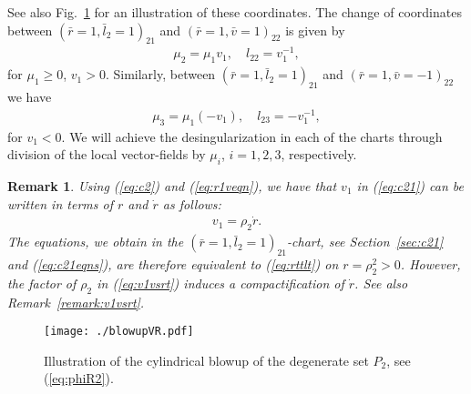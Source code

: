 \documentclass[reqno,12pt]{amsart}
\newcommand{\secref}[1]{Section~\ref{sec:#1}}
\newcommand{\eqlab}[1]{\label{eq:#1}}
\renewcommand{\eqref}[1]{(\ref{eq:#1})}
\newcommand{\figref}[1]{Fig.~\ref{fig:#1}}
\newcommand{\figlab}[1]{\label{fig:#1}}
\newcommand{\remref}[1]{Remark~\ref{remark:#1}}
\newcommand{\remlab}[1]{\label{remark:#1}}
\newtheorem{remark}[theorem]{Remark}
\numberwithin{equation}{section}
\begin{document}
See also \figref{blowupVR} for an illustration of these coordinates. 
The change of coordinates between $(\bar r=1,\bar l_2=1)_{21}$ and $(\bar r=1,\bar v=1)_{22}$ is given by 
\begin{align}
 \mu_2=\mu_1 v_1,\quad l_{22}=v_1^{-1},\eqlab{cc2122}
\end{align}
for $\mu_1\ge 0$, $v_1>0$. Similarly, between $(\bar r=1,\bar l_2=1)_{21}$ and $(\bar r=1,\bar v=-1)_{22}$ we have
\begin{align}
 \mu_3=\mu_1 (-v_1),\quad l_{23}=-v_1^{-1},\eqlab{cc2223}
\end{align}
for $v_1<0$. 
We will achieve the desingularization in each of the charts through division of the local vector-fields by $\mu_i$, $i=1,2,3$, respectively.

\begin{remark}\remlab{v1vsrt0}
 Using \eqref{c2} and \eqref{r1veqn}, we have that $v_1$ in \eqref{c21} can be written in terms of $r$ and $\dot r$ as follows:
 \begin{align}
v_1 = \rho_2 \dot r.\eqlab{v1vsrt}
 \end{align}
The equations, we obtain in the $(\bar r=1,\bar l_2=1)_{21}$-chart, see \secref{c21} and \eqref{c21eqns}, are therefore equivalent to \eqref{rttlt}
on $r=\rho_2^2>0$. However, the factor of $\rho_2$ in  \eqref{v1vsrt} induces a compactification of $\dot r$. See also \remref{v1vsrt}.
\end{remark}



\begin{figure}[h!]
 	\begin{center}
 		{\texttt{[image: ./blowupVR.pdf]}}
 		\caption{Illustration of the cylindrical blowup of the degenerate set $P_2$, see \eqref{phiR2}. }\figlab{blowupVR}
 	\end{center}
 \end{figure}
 
\end{document}
